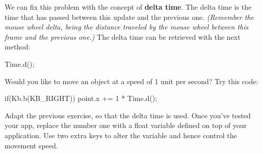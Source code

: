 We can fix this problem with the concept of \textbf{delta time}. The delta time is the time that has passed between this update and the previous one. \textsl{(Remember the mouse wheel delta, being the distance traveled by the mouse wheel between this frame and the previous one.)} The delta time can be retrieved with the next method:

\begin{code}
Time.d();
\end{code}
Would you like to move an object at a speed of 1 unit per second? Try this code:

\begin{code}
if(Kb.b(KB_RIGHT)) point.x += 1 * Time.d();
\end{code}

\begin{exercise}
Adapt the previous exercise, so that the delta time is used. Once you've tested your app, replace the number one with a float variable defined on top of your application. Use two extra keys to alter the variable and hence control the movement speed.
\end{exercise}



